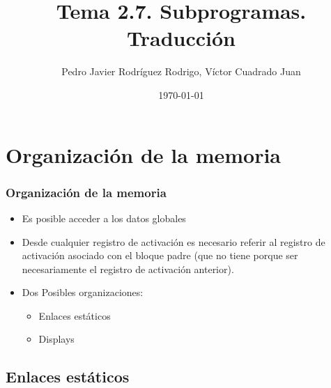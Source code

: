 \documentclass[hyperref={pdfpagelabels=false},tree-dvips]{beamer}
\title{Tema 2.7. Subprogramas. Traducción}
\author{Pedro Javier Rodríguez Rodrigo, Víctor Cuadrado Juan}
\date{\today}
\begin{document}
\begin{frame}
\titlepage
\end{frame}
\section{Organización de la memoria}
\begin{frame}[fragile]
\frametitle{Organización de la memoria}

\begin{itemize}[<+->]%
	\item Es posible acceder a los datos globales
	\item Desde cualquier registro de activación es necesario referir al registro de activación asociado con el bloque padre (que no tiene porque ser necesariamente el registro de activación anterior).
	\item Dos Posibles organizaciones:
		\begin{itemize}[<+->]
			\item Enlaces estáticos
			\item Displays
		\end{itemize}
\end{itemize}

\end{frame}
\subsection{Enlaces estáticos}
\end{document}
